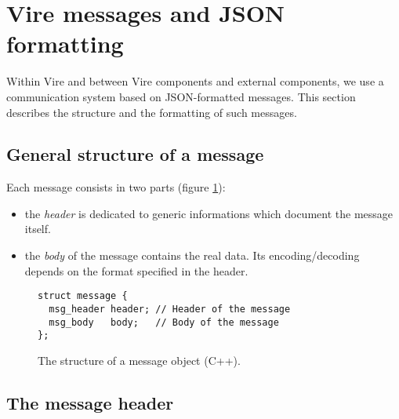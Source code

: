 
\section{Vire messages and JSON formatting}\label{app:json_fmt}

Within Vire  and between Vire  components and external  components, we
use  a communication  system based  on JSON-formatted  messages.  This
section describes the structure and the formatting of such messages.

\subsection{General structure of a message}

Each message consists in two parts (figure \ref{fig-app-json-message}):
\begin{itemize}

\item  the \emph{header}  is dedicated  to generic  informations which
  document the message itself.

\item  the \emph{body}  of the  message  contains the  real data.  Its
  encoding/decoding depends on the format specified in the header.

\end{itemize}

\begin{figure}[h]
\vskip 10pt
\small
\begin{Verbatim}[frame=single,xleftmargin=0.cm,label=\fbox{C++}]
struct message {
  msg_header header; // Header of the message
  msg_body   body;   // Body of the message
};
\end{Verbatim}
\normalsize
\caption{The structure of a message object (C++).}\label{fig-app-json-message}
\end{figure}

\subsection{The message header}

